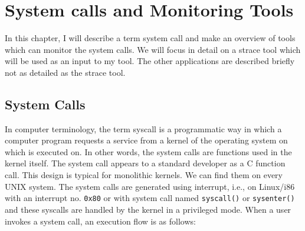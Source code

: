 \chapter{System calls and Monitoring Tools}
\label{chap:syscalls}
In this chapter, I will describe a term system call and make an overview of tools which can monitor the system calls.
We will focus in detail on a strace tool which will be used as an input to my tool.
The other applications are described briefly not as detailed as the strace tool.

\section{System Calls}

In computer terminology, the term syscall is a programmatic way in which a computer program requests a service from a kernel of the operating system on which is executed on.
In other words, the system calls are functions used in the kernel itself.
The system call appears to a standard developer as a C function call.
This design is typical for monolithic kernels.
We can find them on every UNIX system.
The system calls are generated using interrupt, i.e., on Linux/i86 with an interrupt no. \texttt{0x80} or with system call named \texttt{syscall()} or \texttt{sysenter()} and these syscalls are handled by the kernel in a privileged mode.
When a user invokes a system call, an execution flow is as follows:
